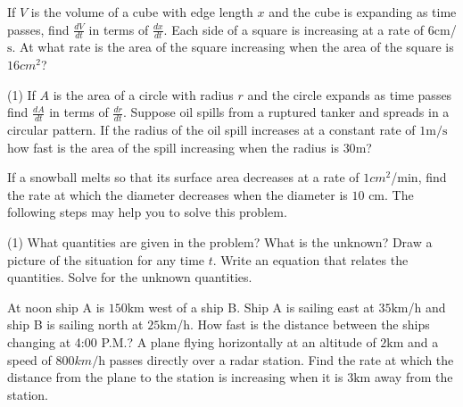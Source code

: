 \begin{Exercise}[title={Related Rates},label=exRelatedRates]
	\Question If $V$ is the volume of a cube with edge length $x$ and the cube is expanding as time passes, find $\frac{d V}{d t}$ in terms of $\frac{d x}{d t}$. %
	\Question Each side of a square is increasing at a rate of $6 \mbox{cm}$/$\mbox{s}$. At what rate is the area of	the square increasing when the area of the square is $16 cm^{2}$?  %
	\Question 
	\begin{tasks}(1)
		\task  If $A$ is the area of a circle with radius $r$ and the circle expands as time passes find $\frac{d A}{d t}$ in terms of $\frac{d r}{d t}$. %
		\task  Suppose oil spills from a ruptured tanker and spreads in a circular pattern. If the radius of the oil spill increases at a constant rate of $1 \mathrm{m}/\mbox{s}$ how fast is the area of the spill increasing when the radius is $30 \mbox{m}$? %
	\end{tasks}
	
	\Question If a snowball melts so that its surface area decreases at a rate of $1 cm^{2}$/$\mbox{min}$, find the rate at which the diameter decreases when the diameter is $10$ $\mbox{cm}$. The following steps may help you to solve this problem. %
	\begin{tasks}(1)
		\task What quantities are given in the problem? 
		\task What is the unknown?
		\task Draw a picture of the situation for any time $t$. 
		\task Write an equation that relates the quantities. 
		\task Solve for the unknown quantities.		
	\end{tasks}
	\Question At noon ship A is $150 \mbox{km}$ west of a ship B. Ship A is sailing east at $35 \mbox{km}$/$\mbox{h}$ and ship B is sailing north at $25 \mbox{km}$/$\mbox{h}$. How fast is the distance between the ships changing at 4:00 P.M.? %
	\Question A plane flying horizontally at an altitude of $2 \mbox{km}$ and a speed of $800 km/\mbox{h}$ passes directly over a radar station. Find the rate at which the distance from the plane to the station is increasing when it is $3 \mbox{km}$ away from the station.%


\end{Exercise}
